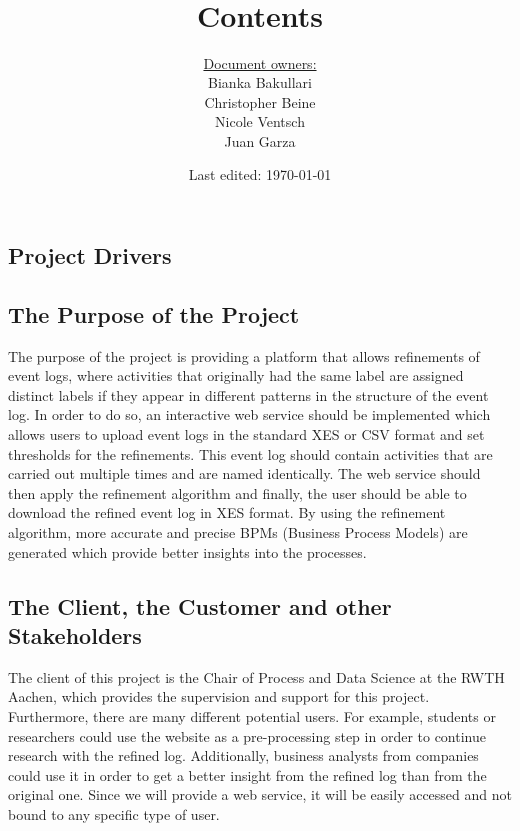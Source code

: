 \documentclass[notitlepage]{article}
\title{%
	\documentName\text{ } \\
  \large \projectName\text{ } \\
  }
\author{
	\large \underline{Document owners:}\\ 
	Bianka Bakullari\\
	\texttt{}
	Christopher Beine\\
	\texttt{}
	Nicole Ventsch\\
	\texttt{}
	Juan Garza\\
	\texttt{}
}
\date{\small{Last edited: \today}}
\begin{document}
\begin{titlepage}
\clearpage\maketitle			%
\thispagestyle{fancy}


\end{titlepage}

\title{ \large \textbf{ Contents}}
\tableofcontents

\newpage

\rfoot{\thepage}				%


\begin{flushleft}				%

\section{Project Drivers}

\subsection{The Purpose of the Project}

The purpose of the project is providing a platform that allows refinements of event logs, where activities that originally had the same label are assigned distinct labels  if they appear in different patterns in the structure of the event log. 
In order to do so, an interactive web service should be implemented which allows users to upload event logs in the standard XES or CSV format and set thresholds for the refinements. 
This event log should contain activities that are carried out multiple times and are named identically. 
The web service should then apply the refinement algorithm and finally, the user should be able to download the refined event log in XES format. 
By using the refinement algorithm, more accurate and precise BPMs (Business Process Models) are generated which provide better insights into the processes.

\subsection{The Client, the Customer and other Stakeholders}

The client of this project is the Chair of Process and Data Science at the RWTH Aachen, which provides the supervision and support for this project. Furthermore, there are many different potential users. For example, students or researchers could use the website as a pre-processing step in order to continue research with the refined log. Additionally, business analysts from companies could use it in order to get a better insight from the refined log than from the original one. Since we will provide a web service, it will be easily accessed and not bound to any specific type of user. 








\end{flushleft}
\end{document}
